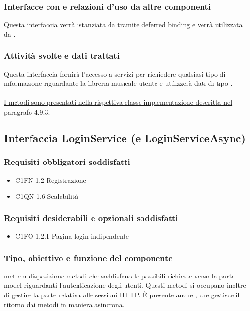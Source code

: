 \subsubsection*{Interfacce con e relazioni d'uso da altre componenti}
Questa interfaccia verr\`a istanziata da  tramite deferred
binding e verr\`a utilizzata da .
\subsubsection*{Attivit\`a svolte e dati trattati}
Questa interfaccia fornir\`a l'accesso a servizi per richiedere qualsiasi tipo
di informazione riguardante la libreria musicale utente e utilizzer\`a dati di
tipo .\\\\
\underline{I metodi sono presentati nella rispettiva classe implementazione
descritta nel paragrafo 4.9.3.}


\subsection{Interfaccia LoginService (e LoginServiceAsync)}
\subsubsection*{Requisiti obbligatori soddisfatti}
\begin{itemize}
	\item C1FN-1.2 Registrazione
	\item C1QN-1.6 Scalabilit\`a
\end{itemize}
\subsubsection*{Requisiti desiderabili e opzionali soddisfatti}
\begin{itemize}
    \item C1FO-1.2.1 Pagina login indipendente
\end{itemize}
\subsubsection*{Tipo, obiettivo e funzione del componente}
 mette a disposizione metodi
che soddisfano le possibili richieste verso la parte model riguardanti l'autenticazione degli utenti.
Questi metodi si occupano inoltre di gestire la parte relativa alle sessioni HTTP. 
\`E presente anche , che gestisce il ritorno dai
metodi in maniera asincrona.
